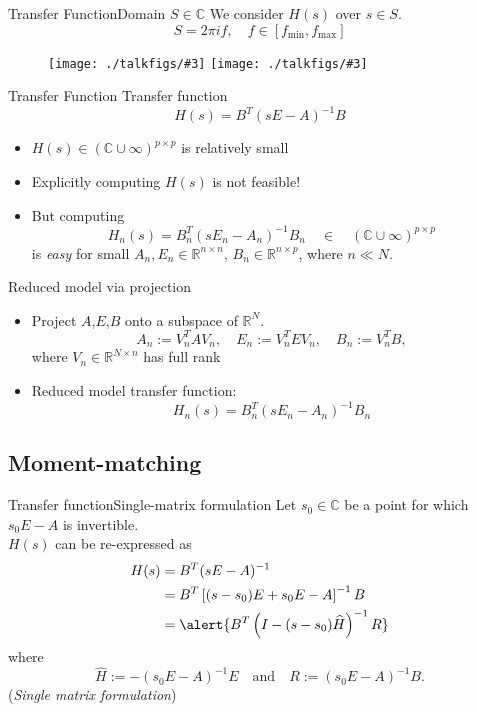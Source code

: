 \documentclass{beamer}
\newcommand{\R}{\mathbb{R}}
\newcommand{\C}{\mathbb{C}}
\newcommand{\A}{\widehat{H}}
\newcommand{\nin}{p}  %
\theoremstyle{remark}
\newcommand{\putfig}[3][{}]{\texttt{[image: ./talkfigs/\#3]}} %
\begin{document}
 
 
 
 \begin{frame}{Transfer Function}{Domain $S\in\C$}
  We consider $H(s)$ over $s\in S$.
  \[
  		S = 2\pi if,\quad f\in\left[f_\mathrm{min},f_\mathrm{max}\right]
  \]
     \begin{figure}
     \centering
     	\putfig{0.48}{ex1841s1_urm_tfuncS.png}\hfill
     	\putfig[{570 402}]{0.48}{Splane2.png}
     \end{figure}
 \end{frame}

 
 
 \begin{frame}{Transfer Function}%
   Transfer function 
  \[  H(s) =  B^T(sE-A)^{-1}B  \]
	  \begin{itemize}
		  \item $H(s) \in (\C\cup\infty)^{\nin \times \nin}$ is relatively small
		  \item Explicitly computing $H(s)$ is not feasible! 
		  \item But computing
		   \[ 
				H_n(s) = B_n^T(sE_n-A_n)^{-1}B_n  
				\quad \in \quad(\C\cup\infty)^{\nin \times \nin}
		   \]
			is \emph{easy} for small $A_n,E_n\in\R^{n\times n}$, 
			$B_n\in\R^{n\times \nin}$, where $n\ll N$.
	   \end{itemize}
\end{frame}
 
 
 
\begin{frame}{Reduced model via projection}
	\begin{itemize}
		\item Project $A$,$E$,$B$ onto a subspace of $\R^N$.   
			\[
			 A_n := V_n^TAV_n, \quad E_n := V_n^TEV_n, \quad B_n := V_n^TB,
			\]
		where $V_n\in\R^{N\times n}$ has full rank  
		\bigskip 
		
		\item Reduced model transfer function: 
		\[ H_n(s)=B_n^T(sE_n-A_n)^{-1}B_n \]
	\end{itemize}      
\end{frame}
  
  
  
\subsection{Moment-matching}

\begin{frame}{Transfer function}{Single-matrix formulation}
Let $s_0\in\C$ be a point for which $s_0E-A$ is invertible.\\
$H(s)$ can be re-expressed as  
	\begin{align*}
			H(s) &= B^T(sE-A)^{-1}\\
			    &= B^T\left[(s-s_0)E +s_0E- A\right]^{-1}B\\
				&= \alert{B^T\left(I-(s-s_0)\A\right)^{-1}R} 
	\end{align*}
where 
\[ \A := -(s_0E-A)^{-1}E\quad\text{and}\quad R := (s_0E-A)^{-1}B. \]
(\alert{\emph{Single matrix formulation}})

\end{frame}
\end{document}
